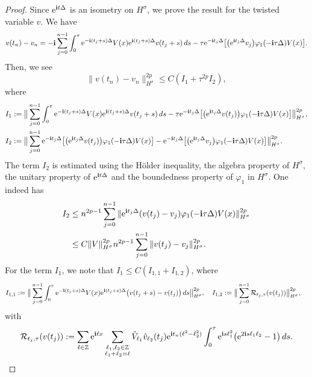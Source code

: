 \documentclass[a4paper]{amsart}
\begin{document}
\begin{proof}
Since ${\rm e}^{{\bf i}t\Delta}$ is an isometry on $H^\sigma$, we prove the result for the twisted variable $v$. We have
$$
v(t_n)-v_n=-{\bf i}\displaystyle\sum_{j=0}^{n-1}\int_{0}^{\tau}{\rm e}^{-{\bf i}(t_j+s)\Delta} V(x){\rm e}^{{\bf i}(t_j+s)\Delta}v(t_j+s)\,ds
-\tau {\rm e}^{-{\bf i}t_j\Delta}\big[\big({\rm e}^{{\bf i}t_j \Delta} v_j\big)\varphi_1(-{\bf i}\tau\Delta)V(x)\big].
$$
Then, we see
$$
\|v(t_n)-v_n\|^{2p}_{H^\sigma}\le C(I_1+\tau^{2p} I_2),
$$ where
\begin{align*}
    &I_1:=\big\|\displaystyle\sum_{j=0}^{n-1}\int_{0}^{\tau}{\rm e}^{-{\bf i}(t_j+s)\Delta} V(x){\rm e}^{{\bf i}(t_j+s)\Delta}v(t_j+s)\,ds-\tau {\rm e}^{-{\bf i}t_j\Delta}\big[\big({\rm e}^{{\bf i}t_j \Delta} v(t_j)\big)\varphi_1(-{\bf i}\tau\Delta)V(x)\big]\big\|^{2p}_{H^\sigma},\\
    &I_2:=\big\|\displaystyle\sum_{j=0}^{n-1}{\rm e}^{-{\bf i}t_j\Delta}\big[\big({\rm e}^{{\bf i}t_j \Delta} v(t_j)\big)\varphi_1(-{\bf i}\tau\Delta)V(x)\big]-{\rm e}^{-{\bf i}t_j\Delta}\big[\big({\rm e}^{{\bf i}t_j \Delta} v_j\big)\varphi_1(-{\bf i}\tau\Delta)V(x)\big]\big\|^{2p}_{H^\sigma}.
\end{align*}
The term $I_2$ is estimated using the Hölder inequality, the algebra property of $H^\sigma$, the unitary property of ${\rm e}^{{\bf i}t\Delta}$ and the boundedness property of $\varphi_1$ in $H^\sigma$. One indeed has
$$
\begin{aligned}
    I_2&\le n^{2p-1} \displaystyle\sum_{j=0}^{n-1}\|{\rm e}^{{\bf i}t_j \Delta}(v(t_j)-v_j)\varphi_1(-{\bf i}\tau \Delta)V(x)\|^{2p}_{H^\sigma}\\
    &\le C \|V\|^{2p}_{H^\sigma} n^{2p-1} \displaystyle\sum_{j=0}^{n-1}\|v(t_j)-v_j\|^{2p}_{H^\sigma}.
\end{aligned}
$$
For the term $I_1$, we note that $I_1\le C( I_{1,1}+I_{1,2})$, where
$$
\begin{aligned}
  &  I_{1,1}:=\big\|\displaystyle\sum_{j=0}^{n-1}\int_{0}^{\tau}{\rm e}^{-{\bf i}(t_j+s)\Delta} V(x){\rm e}^{{\bf i}(t_j+s)\Delta}\big(v(t_j+s)-v(t_j)\big)\,ds\big\|^{2p}_{H^\sigma},\quad 
    I_{1,2}:=\big\|\displaystyle\sum_{j=0}^{n-1}\mathcal{R}_{t_j,\tau}(v(t_j))\big\|^{2p}_{H^\sigma},
\end{aligned}
$$
with
$$
\mathcal{R}_{t_j,\tau}(v(t_j)):=\displaystyle\sum_{\ell\in\mathbb{Z}}{\rm e}^{{\bf i}\ell x}\displaystyle\sum_{\substack{\ell_1,\ell_2\in\mathbb{Z}\\ \ell_1+\ell_2=\ell}}\hat{V}_{\ell_1}\hat{v}_{\ell_2}(t_j){\rm e}^{{\bf i}t_n(\ell^2-\ell_2^2)}\int_{0}^{\tau}{\rm e}^{{\bf i}s \ell_1^2}\big({\rm e}^{2{\bf i}s \ell_1 \ell_2}-1\big)\,ds.
$$
\end{proof}
\end{document}
